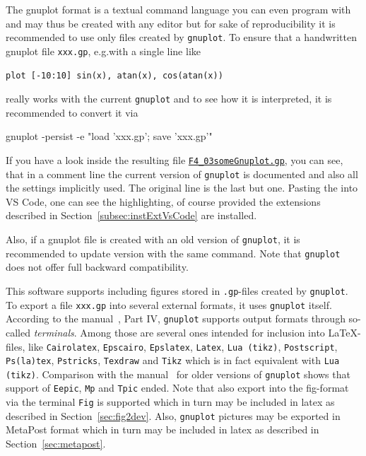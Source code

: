 The gnuplot format is a textual command language you can even program with 
and may thus be created with any editor but
for sake of reproducibility it is recommended to use only files
created by \texttt{gnuplot}.
To ensure that a handwritten gnuplot file \texttt{xxx.gp},
e.g.\@ with a single line like
%
\begin{verbatim}
plot [-10:10] sin(x), atan(x), cos(atan(x))
\end{verbatim}
%
really works
with the current \texttt{gnuplot} and to see how it is interpreted,
it is recommended to convert it via
%
\begin{taglstlisting}
gnuplot -persist -e "load 'xxx.gp'; save 'xxx.gp'"
\end{taglstlisting}
%
If you have a look inside the resulting file 
\href{\urlSite fromTex/F4_03someGnuplot.gp}{\texttt{F4\_03someGnuplot.gp}}, 
you can see, that in a comment line
the current version of \texttt{gnuplot} is documented
and also all the settings implicitly used.
The original line is the last but one. 
Pasting the into VS Code, one can see the highlighting, 
of course provided the extensions 
described in Section~\ref{subsec:instExtVsCode} are installed. 

Also, if a gnuplot file is created with an old version of \texttt{gnuplot},
it is recommended to update version with the same command.
Note that \texttt{gnuplot} does not offer full backward compatibility. 


This software supports including 
figures stored in \texttt{.gp}-files created by \texttt{gnuplot}.
To export a file \texttt{xxx.gp} into several external formats, 
it uses \texttt{gnuplot} itself. 
According to the manual~\cite{GnuPlot6_0}, Part IV, 
\texttt{gnuplot} supports output formats through so-called \emph{terminals}. 
Among those are several ones intended for inclusion into \LaTeX-files, 
like \texttt{Cairolatex}, \texttt{Epscairo}, \texttt{Epslatex}, 
\texttt{Latex}, \texttt{Lua (tikz)}, \texttt{Postscript}, \texttt{Ps(la)tex}, %
\texttt{Pstricks}, \texttt{Texdraw} and \texttt{Tikz} 
which is in fact equivalent with \texttt{Lua (tikz)}. 
Comparison with the manual~\cite{GnuPlot5_0} for older versions of \texttt{gnuplot} 
shows that support of \texttt{Eepic}, \texttt{Mp} and \texttt{Tpic} ended. 
Note that also export into the fig-format via the terminal \texttt{Fig} 
is supported which in turn may be included in latex 
as described in Section~\ref{sec:fig2dev}. 
Also, \texttt{gnuplot} pictures may be exported in MetaPost format 
which in turn may be included in latex 
as described in Section~\ref{sec:metapost}. 

